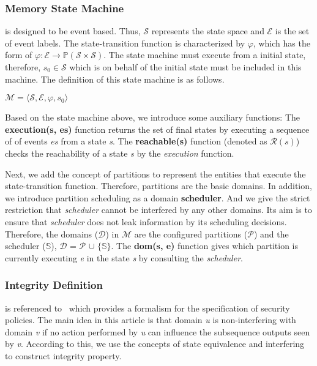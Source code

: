\subsubsection{Memory State Machine} is designed to be event based. Thus, $\mathcal{S}$ represents the state space and $\mathcal{E}$ is the set of event labels. The state-transition function is characterized by $\varphi$, which has the form of $\varphi: \mathcal{E} \rightarrow \mathbb{P}(\mathcal{S} \times \mathcal{S})$. The state machine must execute from a initial state, therefore, $s_0 \in \mathcal{S}$ which is on behalf of the initial state must be included in this machine. The definition of this state machine is as follows.

\begin{definition}  $\mathcal{M} = \langle \mathcal{S}, \mathcal{E}, \varphi, s_0 \rangle$
\end{definition}

Based on the state machine above, we introduce some auxiliary functions: The \textbf{execution(s, es)} function returns the set of final states by executing a sequence of of events \emph{es} from a state \emph{s}. The \textbf{reachable(s)} function (denoted as $\mathcal{R}(s)$) checks the reachability of a state \emph{s} by the \emph{execution} function.

Next, we add the concept of partitions to represent the entities that execute the state-transition function. Therefore, partitions are the basic domains. In addition, we introduce partition scheduling as a domain \textbf{scheduler}. And we give the strict restriction that \emph{scheduler} cannot be interfered by any other domains. Its aim is to ensure that \emph{scheduler} does not leak information by its scheduling decisions. Therefore, the domains ($\mathcal{D}$) in $\mathcal{M}$ are the configured partitions ($\mathcal{P}$) and the scheduler ($\mathbb{S}$), $\mathcal{D}$ = $\mathcal{P}$ $\cup$ $\lbrace$$\mathbb{S}$$\rbrace$. The \textbf{dom(s, e)} function gives which partition is currently executing \emph{e} in the state \emph{s} by consulting the \emph{scheduler}.

\subsubsection{Integrity Definition} is referenced to~\cite{reg_noninterference} which provides a formalism for the specification of security policies. The main idea in this article is that domain \emph{u} is non-interfering with domain \emph{v} if no action performed by \emph{u} can influence the subsequence outputs seen by \emph{v}. According to this, we use the concepts of state equivalence and interfering to construct integrity property.

